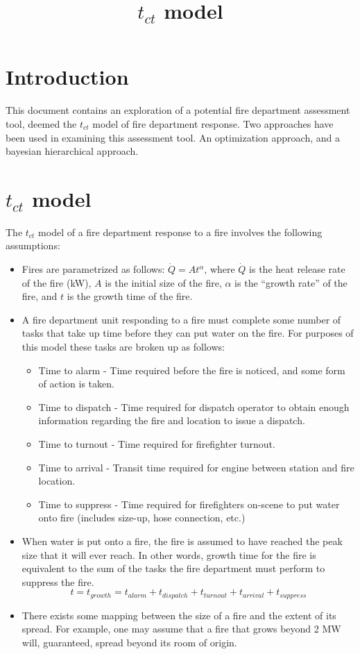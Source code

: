 \documentclass[letterpaper,11pt]{article}
\begin{document}
\title{$t_{ct}$ model}

\maketitle
\section{Introduction}
This document contains an exploration of a potential fire department assessment tool, deemed the $t_{ct}$ model of fire department response. Two approaches have been used in examining this assessment tool. An optimization approach, and a bayesian hierarchical approach.
\section{$t_{ct}$ model}
The $t_{ct}$ model of a fire department response to a fire involves the following assumptions:
\begin{itemize}
  \item Fires are parametrized as follows: $\dot{Q}=At^\alpha$, where $\dot{Q}$ is the heat release rate of the fire (kW), $A$ is the initial size of the fire, $\alpha$ is the ``growth rate'' of the fire, and $t$ is the growth time of the fire.
  \item A fire department unit responding to a fire must complete some number of tasks that take up time before they can put water on the fire. For purposes of this model these tasks are  broken up as follows:
    \begin{itemize}
      \item Time to alarm - Time required before the fire is noticed, and some form of action is taken.
      \item Time to dispatch - Time required for dispatch operator to obtain enough information regarding the fire and location to issue a dispatch.
      \item Time to turnout - Time required for firefighter turnout.
      \item Time to arrival - Transit time required for engine between station and fire location.
      \item Time to suppress - Time required for firefighters on-scene to put water onto fire (includes size-up, hose connection, etc.)
    \end{itemize}
  \item When water is put onto a fire, the fire is assumed to have reached the peak size that it will ever reach. In other words, growth time for the fire is equivalent to the sum of the tasks the fire department must perform to suppress the fire. 
    \[t = t_{growth} = t_{alarm}+t_{dispatch}+t_{turnout}+t_{arrival}+t_{suppress} \]
  \item There exists some mapping between the size of a fire and the extent of its spread. For example, one may assume that a fire that grows beyond 2 MW will, guaranteed, spread beyond its room of origin.
\end{itemize}
\end{document}
